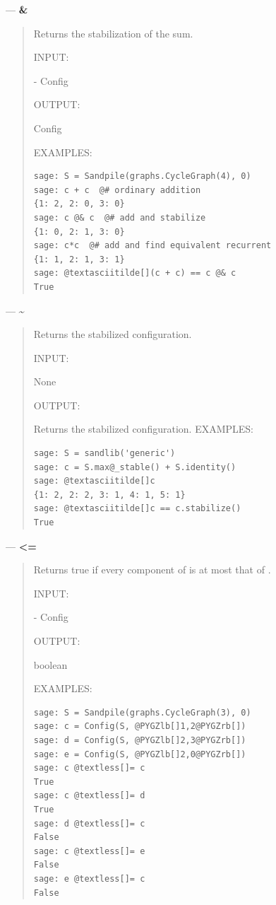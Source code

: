 \documentclass[letterpaper,10pt,english]{manual}
\begin{document}
---
\hypertarget{id9}{}
\textbf{\&}
\begin{quote}

Returns the stabilization of the sum.

INPUT:

 - Config

OUTPUT:

Config

EXAMPLES:

\begin{Verbatim}[commandchars=@\[\]]
sage: S = Sandpile(graphs.CycleGraph(4), 0)
sage: c + c  @# ordinary addition
{1: 2, 2: 0, 3: 0}
sage: c @& c  @# add and stabilize
{1: 0, 2: 1, 3: 0}
sage: c*c  @# add and find equivalent recurrent
{1: 1, 2: 1, 3: 1}
sage: @textasciitilde[](c + c) == c @& c
True
\end{Verbatim}
\end{quote}

---
\hypertarget{id10}{}
\textbf{\textasciitilde{}}
\begin{quote}

Returns the stabilized configuration.

INPUT:

None

OUTPUT:


Returns the stabilized configuration.
EXAMPLES:

\begin{Verbatim}[commandchars=@\[\]]
sage: S = sandlib('generic')
sage: c = S.max@_stable() + S.identity()
sage: @textasciitilde[]c
{1: 2, 2: 2, 3: 1, 4: 1, 5: 1}
sage: @textasciitilde[]c == c.stabilize()
True
\end{Verbatim}
\end{quote}

---
\hypertarget{less-equal}{}
\textbf{\textless{}=}
\begin{quote}

Returns true if every component of  is at most that of
.

INPUT:

 - Config

OUTPUT:

boolean

EXAMPLES:

\begin{Verbatim}[commandchars=@\[\]]
sage: S = Sandpile(graphs.CycleGraph(3), 0)
sage: c = Config(S, @PYGZlb[]1,2@PYGZrb[])
sage: d = Config(S, @PYGZlb[]2,3@PYGZrb[])
sage: e = Config(S, @PYGZlb[]2,0@PYGZrb[])
sage: c @textless[]= c
True
sage: c @textless[]= d
True
sage: d @textless[]= c
False
sage: c @textless[]= e
False
sage: e @textless[]= c
False
\end{Verbatim}
\end{quote}
\end{document}
